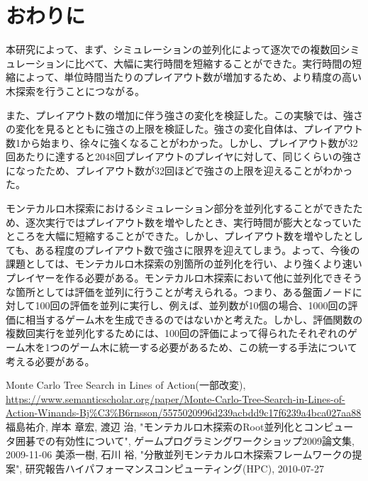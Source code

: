 \documentclass[10pt, a4paper]{jsarticle}
\begin{document}
\section{おわりに}
本研究によって、まず、シミュレーションの並列化によって逐次での複数回シミュレーションに比べて、大幅に実行時間を短縮することができた。実行時間の短縮によって、単位時間当たりのプレイアウト数が増加するため、より精度の高い木探索を行うことにつながる。
\par また、プレイアウト数の増加に伴う強さの変化を検証した。この実験では、強さの変化を見るとともに強さの上限を検証した。強さの変化自体は、プレイアウト数1から始まり、徐々に強くなることがわかった。しかし、プレイアウト数が32回あたりに達すると2048回プレイアウトのプレイヤに対して、同じくらいの強さになったため、プレイアウト数が32回ほどで強さの上限を迎えることがわかった。
\par モンテカルロ木探索におけるシミュレーション部分を並列化することができたため、逐次実行ではプレイアウト数を増やしたとき、実行時間が膨大となっていたところを大幅に短縮することができた。しかし、プレイアウト数を増やしたとしても、ある程度のプレイアウト数で強さに限界を迎えてしまう。よって、今後の課題としては、モンテカルロ木探索の別箇所の並列化を行い、より強くより速いプレイヤーを作る必要がある。モンテカルロ木探索において他に並列化できそうな箇所としては評価を並列に行うことが考えられる。つまり、ある盤面ノードに対して100回の評価を並列に実行し、例えば、並列数が10個の場合、1000回の評価に相当するゲーム木を生成できるのではないかと考えた。しかし、評価関数の複数回実行を並列化するためには、100回の評価によって得られたそれぞれのゲーム木を1つのゲーム木に統一する必要があるため、この統一する手法について考える必要がある。
\begin{thebibliography}{99}
     Monte Carlo Tree Search in Lines of Action(一部改変), \url{https://www.semanticscholar.org/paper/Monte-Carlo-Tree-Search-in-Lines-of-Action-Winands-Bj%C3%B6rnsson/5575020996d239acbdd9c17f6239a4bca027aa88}
     福島祐介, 岸本 章宏, 渡辺 治, "モンテカルロ木探索のRoot並列化とコンピュータ囲碁での有効性について", ゲームプログラミングワークショップ2009論文集, 2009-11-06
     美添一樹, 石川 裕, "分散並列モンテカルロ木探索フレームワークの提案", 研究報告ハイパフォーマンスコンピューティング(HPC), 2010-07-27
\end{thebibliography}
\end{document}
